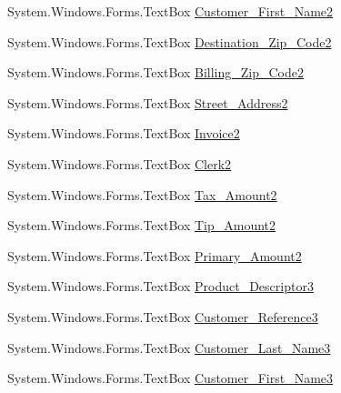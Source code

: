 \begin{DoxyCompactItemize}
\item 
System.\+Windows.\+Forms.\+Text\+Box \mbox{\hyperlink{class_cert_complete_1_1_test___creation___form_ac9e7896e432c0f3cb914eee6775e3ad6}{Customer\+\_\+\+First\+\_\+\+Name2}}
\item 
System.\+Windows.\+Forms.\+Text\+Box \mbox{\hyperlink{class_cert_complete_1_1_test___creation___form_a230196b7fa64509ec09f6c5d30f30fba}{Destination\+\_\+\+Zip\+\_\+\+Code2}}
\item 
System.\+Windows.\+Forms.\+Text\+Box \mbox{\hyperlink{class_cert_complete_1_1_test___creation___form_a3e983b910e19010bd5776911907082ca}{Billing\+\_\+\+Zip\+\_\+\+Code2}}
\item 
System.\+Windows.\+Forms.\+Text\+Box \mbox{\hyperlink{class_cert_complete_1_1_test___creation___form_a2c0de70039463428013476ba0753b49a}{Street\+\_\+\+Address2}}
\item 
System.\+Windows.\+Forms.\+Text\+Box \mbox{\hyperlink{class_cert_complete_1_1_test___creation___form_a91c62882092293892c1da468a4689731}{Invoice2}}
\item 
System.\+Windows.\+Forms.\+Text\+Box \mbox{\hyperlink{class_cert_complete_1_1_test___creation___form_a663f64cfab9590cf0bbaab04bd0cb537}{Clerk2}}
\item 
System.\+Windows.\+Forms.\+Text\+Box \mbox{\hyperlink{class_cert_complete_1_1_test___creation___form_a81e9ae0c914f54606576163850715fbe}{Tax\+\_\+\+Amount2}}
\item 
System.\+Windows.\+Forms.\+Text\+Box \mbox{\hyperlink{class_cert_complete_1_1_test___creation___form_ac39a581025e58ce6afe9aa6191d7089c}{Tip\+\_\+\+Amount2}}
\item 
System.\+Windows.\+Forms.\+Text\+Box \mbox{\hyperlink{class_cert_complete_1_1_test___creation___form_aefc2d44125d6dabdc103e6641b79fb81}{Primary\+\_\+\+Amount2}}
\item 
System.\+Windows.\+Forms.\+Text\+Box \mbox{\hyperlink{class_cert_complete_1_1_test___creation___form_ac2c0cbb20fff50e72a396224e3b5e024}{Product\+\_\+\+Descriptor3}}
\item 
System.\+Windows.\+Forms.\+Text\+Box \mbox{\hyperlink{class_cert_complete_1_1_test___creation___form_af2a3a9b13e290ac444c7c13cd7dd3dc8}{Customer\+\_\+\+Reference3}}
\item 
System.\+Windows.\+Forms.\+Text\+Box \mbox{\hyperlink{class_cert_complete_1_1_test___creation___form_a4f147ae11eed9fc0815e351f02c0d298}{Customer\+\_\+\+Last\+\_\+\+Name3}}
\item 
System.\+Windows.\+Forms.\+Text\+Box \mbox{\hyperlink{class_cert_complete_1_1_test___creation___form_a01d68ddd64e7d097a75019b786f673d5}{Customer\+\_\+\+First\+\_\+\+Name3}}

\end{DoxyCompactItemize}
